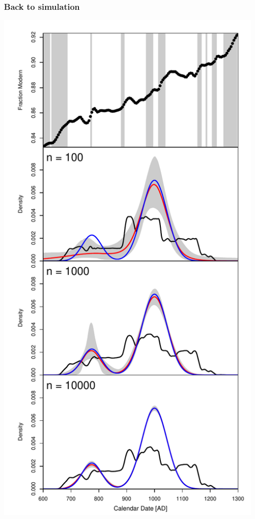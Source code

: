 \documentclass{beamer}
\begin{document}
\begin{frame}[t]
  \frametitle{Back to simulation}
    \includegraphics[height=.85\textheight]{Fig1_sim_inference.pdf}
\end{frame}
\end{document}
